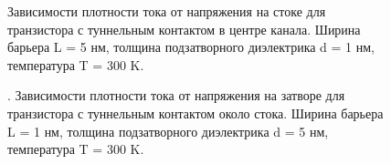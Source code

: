 \documentclass[a4paper,12pt]{article} %
\begin{document}
\begin{figure}[h!]
\caption{ Зависимости плотности тока от напряжения на стоке для транзистора с туннельным контактом в центре канала. Ширина барьера L = 5 нм, толщина подзатворного диэлектрика d = 1 нм, температура T = 300 K.}
\end{figure}

\begin{figure}[h!]
\caption{ . Зависимости плотности тока от напряжения на затворе для транзистора с туннельным контактом около стока. Ширина барьера L = 1 нм, толщина подзатворного диэлектрика d = 5 нм, температура T = 300 K.}
\end{figure}
\end{document}
